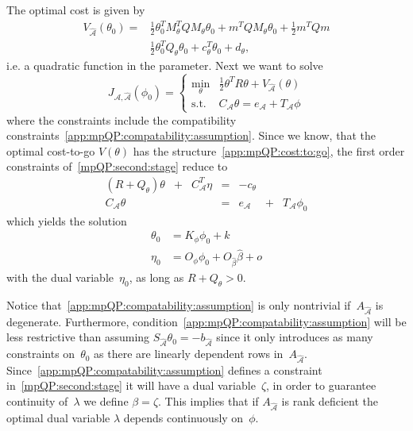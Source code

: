The optimal cost is given by
%
\begin{equation}\label{app:mpQP:cost:to:go}\begin{split}
	V_{\hat{\mathcal A}}(\theta_0) = &\frac{1}{2}\theta^T_0 M_\theta^T Q M_\theta \theta_0 + m^TQM_\theta \theta_0 + 
	\frac{1}{2} m^T Q m\\
	&\frac{1}{2} \theta^T_0 Q_\theta \theta_0 + c^T_\theta \theta_0 + d_\theta,
\end{split}\end{equation}
%
i.e. a quadratic function in the parameter.
%
Next we want to solve
%
\begin{equation}\label{mpQP:second:stage}
	J_{\mathcal A,\hat{\mathcal A}}(\phi_0) = \left\{\begin{array}{rl}
	\min_\theta & \frac{1}{2}\theta^TR\theta + V_{\hat{\mathcal A}}(\theta)\\
	\text{s.t.} & C_{\mathcal A}\theta = e_{\mathcal A} + T_{\mathcal A} \phi
	\end{array}\right.
\end{equation}
%
where the constraints include the compatibility constraints~\eqref{app:mpQP:compatability:assumption}. 
%
Since we know, that the optimal cost-to-go $V(\theta)$ has the structure~\eqref{app:mpQP:cost:to:go},
the first order constraints of~\eqref{mpQP:second:stage} reduce to
%
\begin{equation}\label{mpQP:second:stage:conditions}
	\begin{array}{ccccccc}
		(R + Q_\theta)\theta &+& C^T_{{\mathcal A}}\eta & = & -c_\theta&& \\
		C_{{\mathcal A}} \theta & & & = & e_{{\mathcal A}}& +& T_{{\mathcal A}}\phi_0
	\end{array}
\end{equation}
%
which yields the solution
%
\begin{equation}
	\begin{split}
	\theta_0 &= K_\phi \phi_0 + k\\
	\eta_0 &= O_\phi \phi_0 + O_{\hat\beta} \hat\beta + o
	\end{split}
\end{equation}
%
with the dual variable~$\eta_0$, as long as $R+Q_\theta>0$.

Notice that~\eqref{app:mpQP:compatability:assumption} is only nontrivial if~$A_{\hat{\mathcal A}}$ is degenerate.
%
Furthermore, condition~\eqref{app:mpQP:compatability:assumption} will be less restrictive than assuming 
$S_{\hat{\mathcal A}}\theta_0=-b_{\hat{\mathcal A}}$ since it only introduces as many constraints on~$\theta_0$ 
as there are linearly dependent rows in~$A_{\hat{\mathcal A}}$.
%
Since~\eqref{app:mpQP:compatability:assumption} defines a constraint in~\eqref{mpQP:second:stage} it will have a dual
variable~$\zeta$, in order to guarantee continuity of~$\lambda$ we define $\beta=\zeta$.
%
This implies that if $A_{\hat{\mathcal A}}$ is rank deficient the optimal dual variable $\lambda$
depends continuously on~$\phi$.

